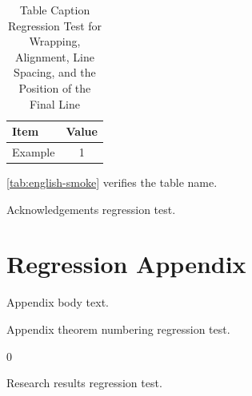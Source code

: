 \documentclass[english,tocdepth3]{uestcthesis}
\begin{document}
\begin{table}[htbp]
    \centering
    \caption{Table Caption Regression Test for Wrapping, Alignment, Line Spacing, and the Position of the Final Line}
    \label{tab:english-smoke}
    \begin{tabular}{lc}
        \toprule
        Item & Value \\
        \midrule
        Example & 1 \\
        \bottomrule
    \end{tabular}
\end{table}

\autoref{tab:english-smoke} verifies the table name.

\uestcacknowledgements
Acknowledgements regression test.

\uestcprintbibliography

\uestcappendix
\chapter{Regression Appendix}
Appendix body text.
\begin{theorem}Appendix theorem numbering regression test.\end{theorem}
\begin{algorithm}[htbp]
    \caption{Appendix Algorithm Numbering Regression Test}
    \begin{algorithmic}
        \State \Return $0$
    \end{algorithmic}
\end{algorithm}

\uestcachievements
Research results regression test.
\end{document}
